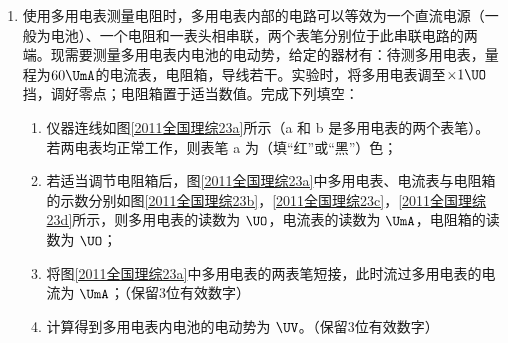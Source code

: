 \documentclass[\gkver]{gaokaozhenti}
\begin{document}
\begin{enumerate}
{（2）1 滴油酸酒精溶液含油酸的体积 $V = \frac{1}{50} \times \frac{1}{300}\Ucmc = \frac{2}{3} \times 10^{-4}\Ucmc = \frac{2}{3} \times 10^{-10}\Umc$，油酸分子的直径约为 $d = \frac{V}{S} = \frac{\frac{2}{3} \times 10^{-10}}{0.13}\Um = 5 \times 10^{-10}\Um$。
}

\item
使用多用电表测量电阻时，多用电表内部的电路可以等效为一个直流电源（一般为电池）、一个电阻和一表头相串联，两个表笔分别位于此串联电路的两端。现需要测量多用电表内电池的电动势，给定的器材有：待测多用电表，量程为$60\UmA$的电流表，电阻箱，导线若干。实验时，将多用电表调至$\times1\UO$挡，调好零点；电阻箱置于适当数值。完成下列填空：

\begin{enumerate}
	\item
	仪器连线如图\ref{2011全国理综23a}所示（a 和 b 是多用电表的两个表笔）。若两电表均正常工作，则表笔 a 为（填“红”或“黑”）色；
	\item
	若适当调节电阻箱后，图\ref{2011全国理综23a}中多用电表、电流表与电阻箱的示数分别如图\ref{2011全国理综23b}，\ref{2011全国理综23c}，\ref{2011全国理综23d}所示，则多用电表的读数为 $\UO$，电流表的读数为 $\UmA$，电阻箱的读数为 $\UO$；
	\item
	将图\ref{2011全国理综23a}中多用电表的两表笔短接，此时流过多用电表的电流为 $\UmA$；（保留3位有效数字）
	\item
	计算得到多用电表内电池的电动势为 $\UV$。（保留3位有效数字）
\end{enumerate}


\end{enumerate}
\end{document}
